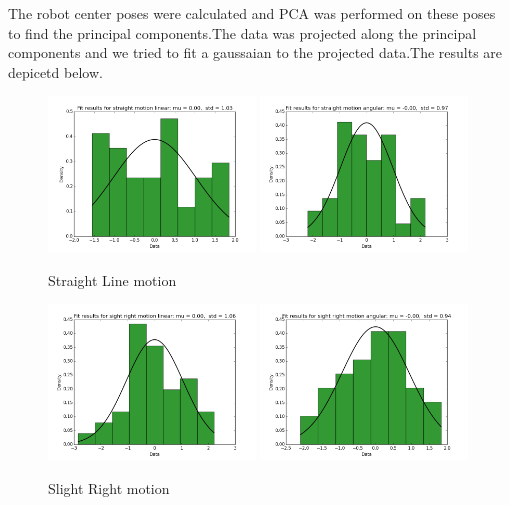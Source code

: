 \documentclass[10pt]{scrartcl}
\begin{document}
The robot center poses were calculated and PCA was performed on these poses to find the principal components.The data was projected along the principal components and we tried to fit a gaussaian to the projected data.The results are depicetd below.


\begin{figure}[H]
\centering
\caption{Straight Line motion}
\label{fig:11}
\includegraphics[width=0.49\textwidth ]{images/pca_straight_linear_data}
\includegraphics[width=0.49\textwidth]{images/pca_straight_angular_data}
\end{figure}

\begin{figure}[H]
\centering
\caption{Slight Right motion}
\label{fig:12}
\includegraphics[width=0.49\textwidth ]{images/pca_slight_right_linear_data}
\includegraphics[width=0.49\textwidth]{images/pca_slight_right_angular_data}
\end{figure}
\end{document}

